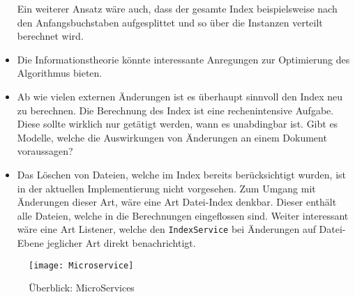 \begin{itemize}
    Ein weiterer Ansatz wäre auch, dass der gesamte Index beispielsweise nach den Anfangsbuchstaben aufgesplittet und so über die Instanzen verteilt berechnet wird.%
    \item Die Informationstheorie könnte interessante Anregungen zur Optimierung des Algorithmus bieten.%
    \item Ab wie vielen externen Änderungen ist es überhaupt sinnvoll den Index neu zu berechnen. Die Berechnung des Index ist eine rechenintensive Aufgabe. Diese sollte wirklich nur getätigt werden, wann es unabdingbar ist. Gibt es Modelle, welche die Auswirkungen von Änderungen an einem Dokument voraussagen?
    \item Das Löschen von Dateien, welche im Index bereits be\-rück\-sich\-tigt wurden, ist in der aktuellen Implementierung nicht vorgesehen. Zum Umgang mit Änderungen dieser Art, wäre eine Art Datei-Index denkbar. Dieser enthält alle Dateien, welche in die Berechnungen eingeflossen sind. Weiter interessant wäre eine Art Listener, welche den \texttt{IndexService} bei Änderungen auf Datei-Ebene jeglicher Art direkt benachrichtigt.%
\end{itemize}



    \begin{figure}[H]
    \centering
    \texttt{[image: Microservice]}
    \caption{Überblick: MicroServices}
    \label{fig:micro-services}
    \end{figure}

